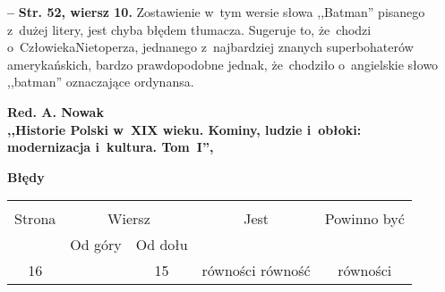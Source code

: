 \documentclass[a4paper,11pt]{article}
\newcommand{\spaceTwo}{2em}
\newcommand{\spaceFour}{0.5em}
\newcommand{\tb}{\textbf}
\newcommand{\noi}{\noindent}
\newcommand{\start}{\noi \tb{--} {}}
\newcommand{\Center}[1]{\begin{center} #1 \end{center}}
\newcommand{\CenterTB}[1]{\Center{\tb{#1}}}
\newcommand{\StrWg}[2]{\tb{Str. #1, wiersz #2.}}
\newcommand{\Work}[1]{ \begin{center} {\large \tb{#1}} \end{center} }
\begin{document}
\vspace{\spaceFour}


\start \StrWg{52}{10} Zostawienie w~tym wersie słowa ,,Batman''
pisanego z~dużej litery, jest chyba błędem tłumacza. Sugeruje to,
że~chodzi o~Człowieka\dywiz Nietoperza, jednanego z~najbardziej
znanych superbohaterów amerykańskich, bardzo prawdopodobne jednak,
że~chodziło o~angielskie słowo ,,batman'' oznaczające ordynansa.


\vspace{\spaceTwo}





\Work{
  Red. A. Nowak \\
  ,,Historie Polski w~XIX wieku. Kominy, ludzie i~obłoki: \\
  modernizacja i~kultura. Tom~I'', \cite{HistoriaPolskiXIXTomI13} }


\CenterTB{Błędy}
\begin{center}
  \begin{tabular}{|c|c|c|c|c|}
    \hline
    & \multicolumn{2}{c|}{} & & \\
    Strona & \multicolumn{2}{c|}{Wiersz}& Jest & Powinno być \\ \cline{2-3}
    & Od góry & Od dołu &  &  \\ \hline
    16 & & 15 & równości równość & równości \\
    \hline
  \end{tabular}
\end{center}

\vspace{\spaceTwo}
\end{document}

